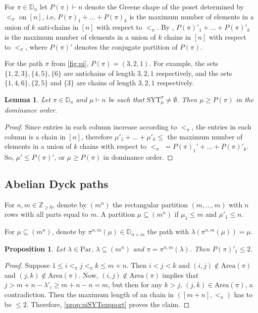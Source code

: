 \documentclass[12pt,reqno]{amsart}
\theoremstyle{plain}
\newtheorem{proposition}[theorem]{Proposition}
\newtheorem{lemma}[theorem]{Lemma}
\theoremstyle{definition}
\theoremstyle{remark}
\theoremstyle{example}
\numberwithin{equation}{section}
\newcommand\ZZ{\mathbb{Z}}
\newcommand\Par{\mathrm{Par}}
\newcommand{\SYT}{\mathrm{SYT}}
\newcommand{\Area}{\mathrm{Area}}
\newcommand{\DD}{\mathbb{D}}
\begin{document}
For $\pi \in \DD_n$ let $P(\pi)\vdash n$ denote the Greene shape of the poset determined by $<_\pi$ on $[n]$, i.e, $P(\pi)_{1}+\ldots+P(\pi)_k$ is the maximum number of elements in a union of $k$ anti-chains in $[n]$ with respect to $<_\pi$. By \cite[Theorem 1.5]{Greene_somepartitions}, $P(\pi)'_1+\ldots+P(\pi)'_k$ is the maximum number of elements in a union of $k$ chains in $[n]$ 
with respect to $<_\pi$, where $P(\pi)'$ denotes the conjugate partition of $P(\pi)$.

For the path $\pi$ from \autoref{fig:pi}, $P(\pi) = (3,2,1)$. For example, the sets $\{1,2,3\}, \{4,5\}, \{6\}$ are antichains of length $3,2,1$ respectively, and the sets $\{1,4,6\}, \{2,5\}$ and $\{3\}$ are chains of length $3,2,1$ respectively.

\begin{lemma}\label{prop:piSYTsupport}
	Let $\pi \in \DD_n$ and $\mu \vdash n$ be such that $\SYT^\pi_\mu \neq \emptyset$. Then $\mu \geq P(\pi)$ in the dominance order.
\end{lemma}

\begin{proof}
	Since entries in each column increase according to $<_\pi$, the entries in each column is a chain in $[n]$, therefore $\mu'_1+\ldots+\mu'_k \leq$ the maximum number of elements in a union of $k$ chains with respect to $<_\pi$ $=P(\pi)_1'+\ldots+P(\pi)'_k$. So, $\mu' \leq P(\pi)'$, or $\mu \geq P(\pi)$ in dominance order.
\end{proof}

\subsection{Abelian Dyck paths}

For $n,m \in \ZZ_{\geq 0}$, denote by $(m^n)$ the rectangular partition $(m,\ldots,m)$ with $n$ rows with all parts equal to $m$. A partition $\mu \subseteq (m^n)$ if $\mu_1 \leq m$ and $\mu'_1 \leq n$. 

For $\mu \subseteq (m^n)$, denote by $\pi^{n,m}(\mu) \in \DD_{n+m}$ the path with $\lambda(\pi^{n,m}(\mu)) = \mu$.

\begin{proposition}\label{prop:abelianGreene}
	Let $\lambda \in \Par$, $\lambda \subseteq (m^n)$ and $\pi = \pi^{n,m}(\lambda)$. Then $P(\pi)'_1 \leq 2$.
\end{proposition}

\begin{proof}
	Suppose $1 \leq i<_\pi j<_\pi k \leq m+n$. Then $i<j<k$ and $(i,j) \notin \Area(\pi)$ and $(j,k) \notin \Area(\pi)$. Now, $(i,j) \notin \Area(\pi)$ implies that $j > m+n-\lambda'_i \geq m+n-n = m$, but then for any $k>j$, $(j,k) \in \Area(\pi)$, a contradiction. Then the maximum length of an chain in $([m+n],<_\pi)$ has to be $\leq 2$. Therefore, \autoref{prop:piSYTsupport} proves the claim.
\end{proof}
\end{document}
